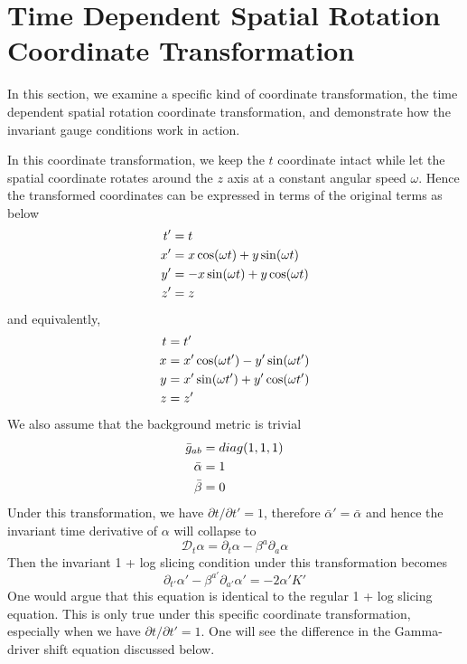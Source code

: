 \documentclass[letterpaper,nofootinbib,prd,amsmath,onecolumn]{revtex4-1}
\begin{document}
\section{Time Dependent Spatial Rotation Coordinate Transformation}\label{example}
In this section, we examine a specific kind of coordinate transformation, the time dependent spatial rotation coordinate transformation, and demonstrate how the invariant gauge conditions work in action. 

In this coordinate transformation, we keep the $t$ coordinate intact while let the spatial coordinate rotates around the $z$ axis at a constant angular speed $\omega$. Hence the transformed coordinates can be expressed in terms of the original terms as below
\begin{align}
t' & = t\notag\\
x' & = x \cos(\omega t) + y\sin(\omega t)\notag\\
y' & = -x\sin(\omega t) + y\cos(\omega t)\notag\\
z' & = z
\end{align}
and equivalently, 
\begin{align}
t & = t'\notag\\
x & = x'\cos(\omega t') - y'\sin(\omega t')\notag\\
y & = x'\sin(\omega t') + y'\cos(\omega t')\notag\\
z & = z'
\end{align}
We also assume that the background metric is trivial
\begin{align}
{\bar g}_{ab} & = diag(1,1,1)\notag\\
{\bar \alpha} & = 1\notag\\
{\bar \beta} & = 0 
\end{align}
Under this transformation, we have $\partial t/\partial t' = 1$, therefore ${\bar \alpha}' = {\bar \alpha}$ and hence the invariant time derivative of $\alpha$ will collapse to
\begin{equation}
\mathscr{D}_{t}\alpha = \partial_{t}\alpha - \beta^{a}\partial_{a}\alpha
\end{equation}
Then the invariant 1 + log slicing condition under this transformation becomes
\begin{equation}\label{transformed 1 + log slicing}
\partial_{t'}\alpha' - \beta^{a'}\partial_{a'}\alpha' = -2\alpha'K'
\end{equation}
One would argue that this equation is identical to the regular 1 + log slicing equation. This is only true under this specific coordinate transformation, especially when we have $\partial t/\partial t' = 1$. One will see the difference in the Gamma-driver shift equation discussed below. 
\end{document}
